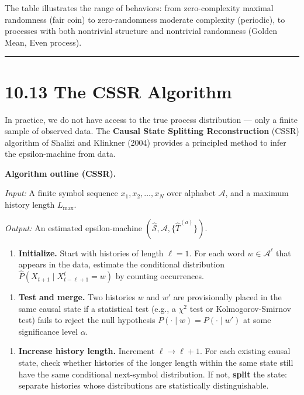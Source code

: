 The table illustrates the range of behaviors: from zero-complexity maximal randomness (fair coin) to zero-randomness moderate complexity (periodic), to processes with both nontrivial structure and nontrivial randomness (Golden Mean, Even process).

\bigskip\hrule\bigskip

\section{10.13 The CSSR Algorithm}

In practice, we do not have access to the true process distribution --- only a finite sample of observed data. The \textbf{Causal State Splitting Reconstruction} (CSSR) algorithm of Shalizi and Klinkner (2004) provides a principled method to infer the epsilon-machine from data.

\textbf{Algorithm outline (CSSR).}

\textit{Input:} A finite symbol sequence $x_1, x_2, \ldots, x_N$ over alphabet $\mathcal{A}$, and a maximum history length $L_{\max}$.

\textit{Output:} An estimated epsilon-machine $(\hat{\mathcal{S}}, \mathcal{A}, \{ \hat{T}^{(a)}\} )$.

\begin{enumerate}
  \item \textbf{Initialize.} Start with histories of length $\ell = 1$. For each word $w \in \mathcal{A}^\ell$ that appears in the data, estimate the conditional distribution $\hat{P}(X_{t+1} \mid X_{t-\ell+1}^{t} = w)$ by counting occurrences.
\end{enumerate}

\begin{enumerate}
  \item \textbf{Test and merge.} Two histories $w$ and $w'$ are provisionally placed in the same causal state if a statistical test (e.g., a $\chi^2$ test or Kolmogorov-Smirnov test) fails to reject the null hypothesis $P(\cdot \mid w) = P(\cdot \mid w')$ at some significance level $\alpha$.
\end{enumerate}

\begin{enumerate}
  \item \textbf{Increase history length.} Increment $\ell \to \ell + 1$. For each existing causal state, check whether histories of the longer length within the same state still have the same conditional next-symbol distribution. If not, \textbf{split} the state: separate histories whose distributions are statistically distinguishable.
\end{enumerate}

